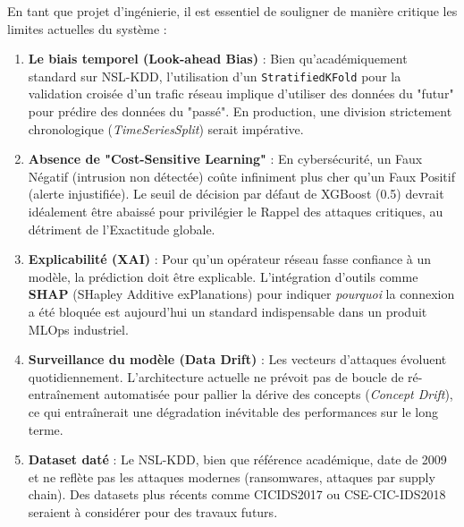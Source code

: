 \documentclass[12pt,a4paper]{report}
\begin{document}
En tant que projet d'ingénierie, il est essentiel de souligner de manière critique les limites actuelles du système :

\begin{enumerate}
    \item \textbf{Le biais temporel (Look-ahead Bias)} : Bien qu'académiquement standard sur NSL-KDD, l'utilisation d'un \texttt{StratifiedKFold} pour la validation croisée d'un trafic réseau implique d'utiliser des données du "futur" pour prédire des données du "passé". En production, une division strictement chronologique (\textit{TimeSeriesSplit}) serait impérative.

    \item \textbf{Absence de "Cost-Sensitive Learning"} : En cybersécurité, un Faux Négatif (intrusion non détectée) coûte infiniment plus cher qu'un Faux Positif (alerte injustifiée). Le seuil de décision par défaut de XGBoost (0.5) devrait idéalement être abaissé pour privilégier le Rappel des attaques critiques, au détriment de l'Exactitude globale.

    \item \textbf{Explicabilité (XAI)} : Pour qu'un opérateur réseau fasse confiance à un modèle, la prédiction doit être explicable. L'intégration d'outils comme \textbf{SHAP} \cite{lundberg2017} (SHapley Additive exPlanations) pour indiquer \textit{pourquoi} la connexion a été bloquée est aujourd'hui un standard indispensable dans un produit MLOps industriel.

    \item \textbf{Surveillance du modèle (Data Drift)} : Les vecteurs d'attaques évoluent quotidiennement. L'architecture actuelle ne prévoit pas de boucle de ré-entraînement automatisée pour pallier la dérive des concepts (\textit{Concept Drift}), ce qui entraînerait une dégradation inévitable des performances sur le long terme.

    \item \textbf{Dataset daté} : Le NSL-KDD, bien que référence académique, date de 2009 et ne reflète pas les attaques modernes (ransomwares, attaques par supply chain). Des datasets plus récents comme CICIDS2017 ou CSE-CIC-IDS2018 seraient à considérer pour des travaux futurs.
\end{enumerate}
\end{document}

